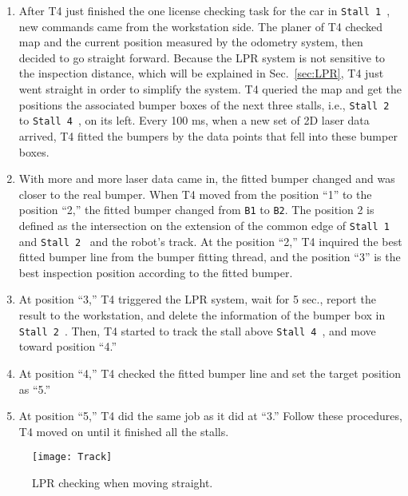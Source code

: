 \documentclass[]{spie}
\newcommand{\draft}{no} %
\newcommand{\stall}[1]{\texttt{Stall #1}\ }
\def\grapath{../img/}
\let\myimg\includegraphics
\renewcommand{\includegraphics}[2][width=0.45\textwidth]{\ifthenelse{\equal{\draft}{yes}} 
    {\centerline{\myimg[#1,draft]{\grapath #2}}}
    {%
        {\ifthenelse{\equal{\draft}{fast}}
            {\centerline{\fbox{Figure #2 will be here}}}
            {\centerline{\myimg[#1]{\grapath #2}}}
        }
    }
}
\begin{document}
    \begin{enumerate}
    \item After T4 just finished the one license checking task for the car in \stall{1}, new commands came from the workstation side. The planer of T4 checked map and the current position measured by the odometry system, then decided to go straight forward. Because the LPR system is not sensitive to the inspection distance, which will be explained in Sec.~\ref{sec:LPR}, T4 just went straight in order to simplify the system. T4 queried the map and get the positions the associated bumper boxes of the next three stalls, i.e., \stall{2} to \stall{4}, on its left. Every 100 ms, when a new set of 2D laser data arrived, T4 fitted the bumpers by the data points that fell into these bumper boxes.
    \item With more and more laser data came in, the fitted bumper changed and was closer to the real bumper. When T4 moved from the position ``1'' to the position ``2,'' the fitted bumper changed from \texttt{B1} to \texttt{B2}. The position 2 is defined as the intersection on the extension of the common edge of \stall{1} and \stall{2} and the robot's track. At the position ``2,'' T4 inquired the best fitted bumper line from the bumper fitting thread, and the position ``3'' is the best inspection position according to the fitted bumper.
    \item At position ``3,'' T4 triggered the LPR system, wait for 5 sec., report the result to the workstation, and delete the information of the bumper box in \stall{2}. Then, T4 started to track the stall above \stall{4}, and move toward position ``4.''
    \item At position ``4,'' T4 checked the fitted bumper line and set the target position as ``5.''
    \item At position ``5,'' T4 did the same job as it did at ``3.'' Follow these procedures, T4 moved on until it finished all the stalls.
    \end{enumerate}



\begin{figure}[!htb]
    \centering
    \begin{minipage}{0.7\textwidth}
        \texttt{[image: Track]}
        \caption{LPR checking when moving straight.}\label{fig:track}
    \end{minipage}
\end{figure}
\end{document}
